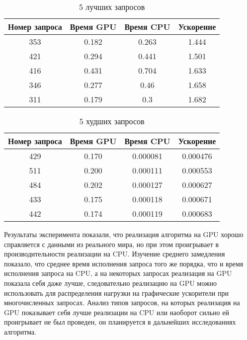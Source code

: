 \begin{table}[]
\centering
    \begin{tabular}{|c|c|c|c|}
    \hline
         Номер запроса & Время GPU & Время CPU & Ускорение \\
    \hline
        353 & 0.182 & 0.263 & 1.444 \\
        421 & 0.294 & 0.441 & 1.501 \\
        416 & 0.431 & 0.704 & 1.633 \\
        346 & 0.277 & 0.46  & 1.658 \\
        311 & 0.179 & 0.3   & 1.682 \\
    \hline
    \end{tabular}
    \caption{5 лучших запросов}
    \label{Best5Queries}
\end{table}

\begin{table}[]
\centering
    \begin{tabular}{|c|c|c|c|}
    \hline
         Номер запроса & Время GPU & Время CPU & Ускорение \\
    \hline
        429 & 0.170 & 0.000081 & 0.000476 \\
        511 & 0.200 & 0.000111 & 0.000553 \\
        484 & 0.202 & 0.000127 & 0.000627 \\
        433 & 0.175 & 0.000118 & 0.000671 \\
        442 & 0.174 & 0.000119 & 0.000683 \\
    \hline
    \end{tabular}
    \caption{5 худших запросов}
    \label{Worst5Queries}
\end{table}


Результаты эксперимента показали, что реализация алгоритма на GPU хорошо справляется с данными из реального мира, но при этом проигрывает в производительности реализации на CPU. Изучение среднего замедления показало, что среднее время исполнения запроса того же порядка, что и время исполнения запроса на CPU, а на некоторых запросах реализация на GPU показала себя даже лучше, следовательно реализацию на GPU можно использовать для распределения нагрузки на графические ускорители при многочисленных запросах. Анализ типов запросов, на которых реализация на GPU показывает себя лучше реализации на CPU или наоборот сильно ей проигрывает не был проведен, он планируется в дальнейших исследованиях алгоритма.  

